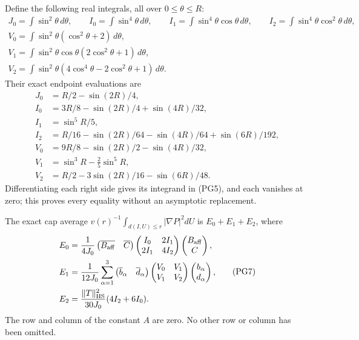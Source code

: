 \documentclass[11pt]{article}
\begin{document}
Define the following real integrals, all over \(0\le\theta\le R\):
\[
 \begin{gathered}
 J_0=\int\sin^2\theta\,d\theta,\qquad
 I_0=\int\sin^4\theta\,d\theta,\qquad
 I_1=\int\sin^4\theta\cos\theta\,d\theta,\qquad
 I_2=\int\sin^4\theta\cos^2\theta\,d\theta,\\
 V_0=\int\sin^2\theta(\cos^2\theta+2)\,d\theta,\\
 V_1=\int\sin^2\theta\cos\theta(2\cos^2\theta+1)\,d\theta,\\
 V_2=\int\sin^2\theta(4\cos^4\theta-2\cos^2\theta+1)\,d\theta .
 \end{gathered}\tag{PG5}
\]
Their exact endpoint evaluations are
\[
 \begin{aligned}
 J_0&=R/2-\sin(2R)/4,\\
 I_0&=3R/8-\sin(2R)/4+\sin(4R)/32,\\
 I_1&=\sin^5R/5,\\
 I_2&=R/16-\sin(2R)/64-\sin(4R)/64+\sin(6R)/192,\\
 V_0&=9R/8-\sin(2R)/2-\sin(4R)/32,\\
 V_1&=\sin^3R-\tfrac25\sin^5R,\\
 V_2&=R/2-3\sin(2R)/16-\sin(6R)/48 .
 \end{aligned}\tag{PG6}
\]
Differentiating each right side gives its integrand in (PG5), and
each vanishes at zero; this proves every equality without an
asymptotic replacement.

The exact cap average
\(v(r)^{-1}\int_{d(I,U)\le r}|\nabla P|^2dU\)
is \(E_0+E_1+E_2\), where
\[
 \begin{aligned}
 E_0&=\frac1{4J_0}
  \begin{pmatrix}\overline{B_{\rm aff}}&\overline C\end{pmatrix}
  \begin{pmatrix}I_0&2I_1\\2I_1&4I_2\end{pmatrix}
  \begin{pmatrix}B_{\rm aff}\\C\end{pmatrix},\\
 E_1&=\frac1{12J_0}\sum_{\alpha=1}^3
  \begin{pmatrix}\overline b_\alpha&\overline d_\alpha\end{pmatrix}
  \begin{pmatrix}V_0&V_1\\V_1&V_2\end{pmatrix}
  \begin{pmatrix}b_\alpha\\d_\alpha\end{pmatrix},\\
 E_2&=\frac{\|T\|_{\rm HS}^2}{30J_0}(4I_2+6I_0).
 \end{aligned}\tag{PG7}
\]
The row and column of the constant \(A\) are zero. No other row or
column has been omitted.
\end{document}
